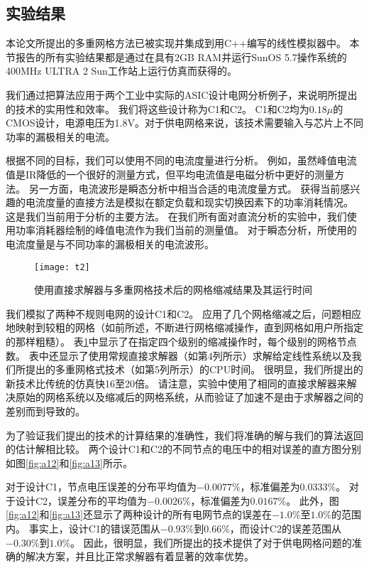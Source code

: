 \subsection{实验结果}
本论文所提出的多重网格方法已被实现并集成到用C++编写的线性模拟器中。 本节报告的所有实验结果都是通过在具有2GB RAM并运行SunOS 5.7操作系统的400MHz ULTRA 2 Sun工作站上运行仿真而获得的。

我们通过把算法应用于两个工业中实际的ASIC设计电网分析例子，来说明所提出的技术的实用性和效率。 我们将这些设计称为C1和C2。 C1和C2均为$0.18\mu$的CMOS设计，电源电压为1.8V。对于供电网格来说，该技术需要输入与芯片上不同功率的漏极相关的电流。

根据不同的目标，我们可以使用不同的电流度量进行分析。 例如，虽然峰值电流值是IR降低的一个很好的测量方式，但平均电流值是电磁分析中更好的测量方法。 另一方面，电流波形是瞬态分析中相当合适的电流度量方式。 获得当前感兴趣的电流度量的直接方法是模拟在额定负载和现实切换因素下的功率消耗情况。 这是我们当前用于分析的主要方法。 在我们所有面对直流分析的实验中，我们使用功率消耗器绘制的峰值电流作为我们当前的测量值。 对于瞬态分析，所使用的电流度量是与不同功率的漏极相关的电流波形。

\begin{figure}[H] %
  \centering
  \texttt{[image: t2]}
  \caption{使用直接求解器与多重网格技术后的网格缩减结果及其运行时间}
  \label{fig:t2}
\end{figure}

我们模拟了两种不规则电网的设计C1和C2。 应用了几个网格缩减之后，问题相应地映射到较粗的网格（如前所述，不断进行网格缩减操作，直到网格如用户所指定的那样粗糙）。 表\ref{fig:t2}中显示了在指定四个级别的缩减操作时，每个级别的网格节点数。 表中还显示了使用常规直接求解器（如第4列所示）求解给定线性系统以及我们所提出的多重网格式技术（如第5列所示）的CPU时间。 很明显，我们所提出的新技术比传统的仿真快16至20倍。 请注意，实验中使用了相同的直接求解器来解决原始的网格系统以及缩减后的网格系统，从而验证了加速不是由于求解器之间的差别而到导致的。

为了验证我们提出的技术的计算结果的准确性，我们将准确的解与我们的算法返回的估计解相比较。 两个设计C1和C2的不同节点的电压中的相对误差的直方图分别如图\ref{fig:a12}和\ref{fig:a13}所示。

对于设计C1，节点电压误差的分布平均值为$-0.0077\%$，标准偏差为$0.0333\%$。 对于设计C2，误差分布的平均值为$-0.0026\%$，标准偏差为$0.0167\%$。 此外，图\ref{fig:a12}和\ref{fig:a13}还显示了两种设计的所有电网节点的误差在$-1.0\%$至$1.0\%$的范围内。 事实上，设计C1的错误范围从$-0.93\%$到$0.66\%$，而设计C2的误差范围从$-0.30\%$到$1.0\%$。 因此，很明显，我们所提出的技术提供了对于供电网格问题的准确的解决方案，并且比正常求解器有着显著的效率优势。


